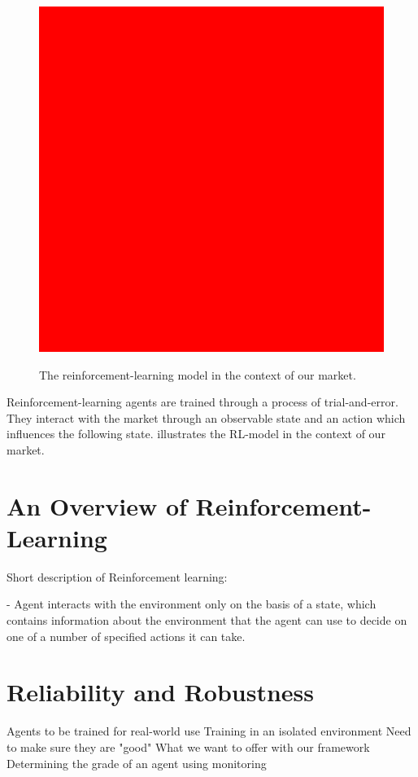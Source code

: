 \begin{figure}
	\centering
	\includegraphics[height = 5 cm]{graphics/red_square_placeholder.png}\\[1 ex]
	\caption{The reinforcement-learning model in the context of our market.}
	\label{fig:IntroRLDiagram}
\end{figure}

Reinforcement-learning agents are trained through a process of trial-and-error. They interact with the market through an observable state
and an action which influences the following state.  illustrates the RL-model in the context of our 
market. 


\section{An Overview of Reinforcement-Learning}

Short description of Reinforcement learning:

- Agent interacts with the environment only on the basis of a state, which contains information about the
environment that the agent can use to decide on one of a number of specified actions it can take.

\section{Reliability and Robustness}


Agents to be trained for real-world use
Training in an isolated environment
Need to make sure they are "good"
What we want to offer with our framework
Determining the grade of an agent using monitoring